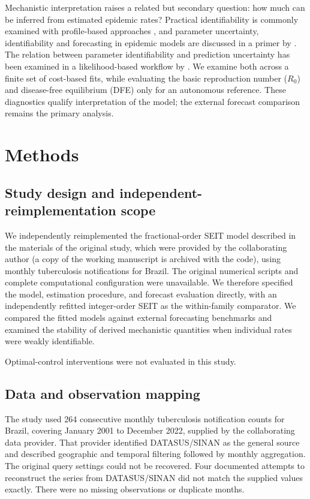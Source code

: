 \documentclass[pdflatex,sn-mathphys-ay,lineno]{sn-jnl}
\begin{document}
Mechanistic interpretation raises a related but secondary question: how much can be inferred from estimated epidemic rates? Practical identifiability is commonly examined with profile-based approaches \citep{raue2009,wieland2021}, and parameter uncertainty, identifiability and forecasting in epidemic models are discussed in a primer by \citet{chowell2017}. The relation between parameter identifiability and prediction uncertainty has been examined in a likelihood-based workflow by \citet{simpson2024}. We examine both across a finite set of cost-based fits, while evaluating the basic reproduction number ($R_0$) and disease-free equilibrium (DFE) only for an autonomous reference. These diagnostics qualify interpretation of the model; the external forecast comparison remains the primary analysis.

\section{Methods}

\subsection{Study design and independent-reimplementation scope}

We independently reimplemented the fractional-order SEIT model described in the materials of the original study, which were provided by the collaborating author (a copy of the working manuscript is archived with the code), using monthly tuberculosis notifications for Brazil. The original numerical scripts and complete computational configuration were unavailable. We therefore specified the model, estimation procedure, and forecast evaluation directly, with an independently refitted integer-order SEIT as the within-family comparator. We compared the fitted models against external forecasting benchmarks and examined the stability of derived mechanistic quantities when individual rates were weakly identifiable.



Optimal-control interventions were not evaluated in this study.

\subsection{Data and observation mapping}

The study used 264 consecutive monthly tuberculosis notification counts for Brazil, covering January 2001 to December 2022, supplied by the collaborating data provider. That provider identified DATASUS/SINAN as the general source and described geographic and temporal filtering followed by monthly aggregation. The original query settings could not be recovered. Four documented attempts to reconstruct the series from DATASUS/SINAN did not match the supplied values exactly. There were no missing observations or duplicate months.
\end{document}
